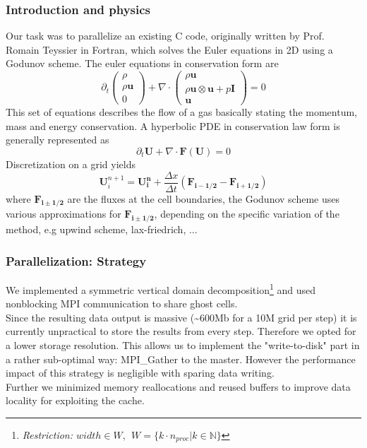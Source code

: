 \documentclass{beamer}
\begin{document}
\begin{frame}
\frametitle{Introduction and physics}
\justify
\small{
Our task was to parallelize an existing C code, originally written by Prof. Romain Teyssier in Fortran, which solves the Euler equations in 2D using a Godunov scheme. The euler equations in conservation form are 
\begin{equation}
\partial_t
\begin{pmatrix} \rho    \\ \rho \mathbf{u}\\0\end{pmatrix}+\nabla\cdot\begin{pmatrix} \rho\mathbf{u}    \\ \rho\mathbf{u}\otimes\mathbf{u}+p\mathbf{I}\\ \mathbf{u}\end{pmatrix} = 0
\end{equation}
This set of equations describes the flow of a gas basically stating the momentum, mass and energy conservation. A hyperbolic PDE in conservation law form is generally represented as
\begin{equation}
\partial_t\mathbf{U} + \nabla\cdot\mathbf{F(U)} = 0
\label{eq:bb}
\end{equation}
Discretization on a grid yields
\begin{equation}
\mathbf{U}^{n+1}_i=\mathbf{U^n_i}+\frac{\Delta x}{\Delta t}(\mathbf{F_{i-1/2}}-\mathbf{F_{i+1/2}})
\label{eq:bc}
\end{equation}
where $\mathbf{F_{i\pm1/2}}$ are the fluxes at the cell boundaries, the Godunov scheme uses various approximations for $\mathbf{F_{i\pm1/2}}$, depending on the specific variation of the method, e.g upwind scheme, lax-friedrich, ... \\
}


\end{frame}

%
%
%
\begin{frame}
\frametitle{Parallelization: Strategy}

We implemented a symmetric vertical domain decomposition\footnote{ 
\emph{Restriction: $width\in W,~~W=\{k\cdot n_{proc}|k\in\mathbb{N}\}$ } } and used nonblocking MPI communication to share ghost cells.\\
\vspace{2mm}
Since the resulting data output is massive (\textasciitilde{}600Mb for a 10M grid per step) it is currently unpractical to store the results from every step. Therefore we opted for a lower storage resolution. This allows us to implement the "write-to-disk" part in a rather sub-optimal way: MPI\_Gather to the master. However the performance impact of this strategy is negligible with sparing data writing.\\
\vspace{2mm}
Further we minimized memory reallocations and reused buffers to improve data locality for exploiting the cache. \\

\end{frame}
\end{document}
